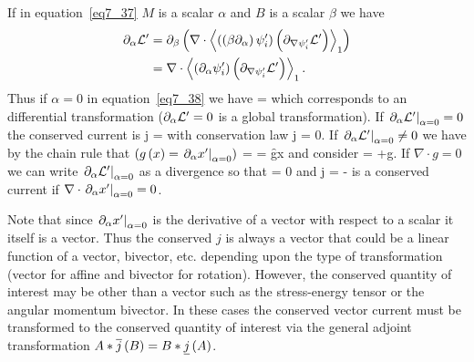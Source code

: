 If in equation~\ref{eq7_37} $M$ is a scalar $\alpha$ and $B$ is a scalar $\beta$ we have
\begin{align}
	\partial_{\alpha}\mathcal{L}' &= \partial_{\beta}\left ( {\nabla\cdot\left \langle {\left ({\left ({\beta\partial_{\alpha}} \right )\psi'_{i}} \right )\left ({\partial_{\nabla\psi'_{i}}\mathcal{L}'} \right )} \right \rangle_{1}} \right ) \nonumber \\
	                      &= \nabla\cdot\left \langle {\left ({\partial_{\alpha}\psi'_{i}} \right )\left ({\partial_{\nabla\psi'_{i}}\mathcal{L}'} \right )} \right \rangle_{1}.\label{eq7_38}
\end{align}
Thus if $\alpha=0$ in equation~\ref{eq7_38} we have
\be
	 = \nabla\cdot{}
\ee
which corresponds to an differential transformation ($\partial_{\alpha}\mathcal{L}'=0$ is a global transformation). If $\left . {\partial_{\alpha}\mathcal{L}'} \right |_{\alpha=0}=0$ 
the conserved current is
\be
	j = 
\ee
with conservation law
\be
	\nabla\cdot j = 0.
\ee
If $\left . {\partial_{\alpha}\mathcal{L}'} \right |_{\alpha=0}\ne 0$ we have by the chain rule that $\left ( {{g}\left ( {x} \right )=\left . {\partial_{\alpha}x'} \right |_{\alpha=0}} \right )$
\be
	 = \cdot{} = \f{g}{x}\cdot\nabla\Lf
\ee
and consider
\be
	\nabla\cdot{} = \Lf+g\cdot\nabla\Lf.
\ee
If $\nabla\cdot g=0$ we can write $\left . {\partial_{\alpha}\mathcal{L}'} \right |_{\alpha=0}$ as a divergence so that
\be
	\nabla\cdot{} = 0
\ee
and
\be
	j = -\Lf
\ee
is a conserved current if $\nabla\cdot\left . {\partial_{\alpha}x'} \right |_{\alpha=0}=0$.

Note that since $\left . {\partial_{\alpha}x'} \right |_{\alpha=0}$ is the derivative of a vector with respect to a scalar it itself is a vector.  Thus the 
conserved $j$ is always a vector that could be a linear function of a vector, bivector, etc. depending upon the type of transformation (vector for affine
and bivector for rotation).  However, the conserved quantity of interest may be other than a
vector such as the stress-energy tensor or the angular momentum bivector.  In these cases the conserved vector current must be transformed to the
conserved quantity of interest via the general adjoint transformation $A*{\overline{j}}\left ( {B} \right ) = B*{\underline{j}}\left ( {A} \right )$. 

